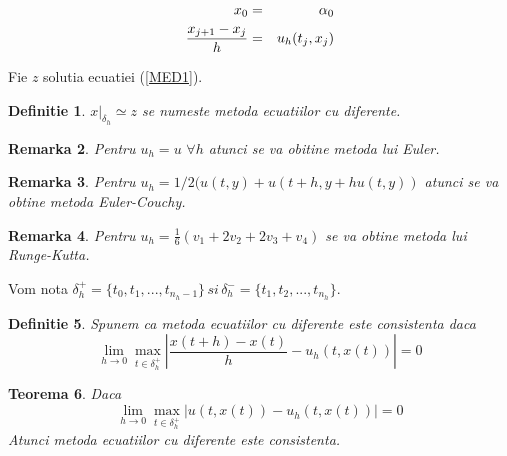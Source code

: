 \documentclass[a4paper,twoside]{book}
\newtheorem{theorem}{Teorema}
\newtheorem{definition}[theorem]{Definitie}
\newtheorem{remark}[theorem]{Remarka}
\begin{document}
\begin{eqnarray}
x_{0} &=&\alpha _{0}  \label{MED1} \\
\frac{x_{j+1}-x_{j}}{h} &=&u_{h}(t_{j},x_{j})  \notag
\end{eqnarray}

Fie $z$ solutia ecuatiei (\ref{MED1}).

\begin{definition}
$x|_{\delta _{h}}\simeq z$ se numeste metoda ecuatiilor cu diferente.
\end{definition}

\begin{remark}
Pentru $u_{h}=u\,\,\forall h$ atunci se va obitine metoda lui Euler.
\end{remark}

\begin{remark}
Pentru $u_{h}=1/2(u(t,y)+u(t+h,y+hu(t,y))$ atunci se va obtine metoda
Euler-Couchy.
\end{remark}

\begin{remark}
Pentru $u_{h}=\frac{1}{6}(v_{1}+2v_{2}+2v_{3}+v_{4})$ se va obtine metoda
lui Runge-Kutta.
\end{remark}

Vom nota $\delta _{h}^{+}=\{t_{0},t_{1},...,t_{n_{h}-1}\}\,si\,\delta
_{h}^{-}=\{t_{1},t_{2},...,t_{n_{h}}\}$.

\begin{definition}
Spunem ca metoda ecuatiilor cu diferente este consistenta daca 
\begin{equation*}
\lim_{h\rightarrow 0}\max_{t\in \delta _{h}^{+}}\left\vert \frac{x(t+h)-x(t)%
}{h}-u_{h}(t,x(t))\right\vert =0
\end{equation*}
\end{definition}

\begin{theorem}
Daca%
\begin{equation}
\lim_{h\rightarrow 0}\max_{t\in \delta _{h}^{+}}\left\vert
u(t,x(t))-u_{h}(t,x(t))\right\vert =0  \label{Th1_1}
\end{equation}%
Atunci metoda ecuatiilor cu diferente este consistenta.
\end{theorem}
\end{document}
